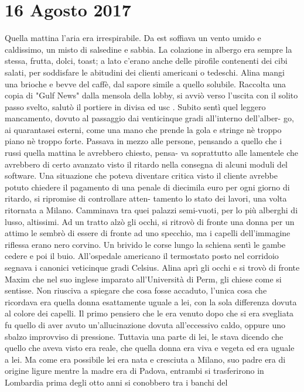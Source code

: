 \section{16 Agosto 2017}
Quella mattina l'aria era irrespirabile. Da est soffiava un vento umido e caldissimo, un
misto di salsedine e sabbia. La colazione in albergo era sempre la stessa, frutta, dolci, toast; a lato
c'erano anche delle pirofile contenenti dei cibi salati, per soddisfare le abitudini dei clienti americani o
tedeschi. Alina mangi una brioche e bevve del caffè, dal sapore simile a quello solubile.
Raccolta una copia di "Gulf News" dalla mensola della lobby, si avviò verso l'uscita con il solito passo
svelto, salutò il portiere in divisa ed usc .
Subito sentì quel leggero mancamento, dovuto al passaggio dai venticinque gradi all'interno dell'alber-
go, ai quarantasei esterni, come una mano che prende la gola e stringe nè troppo piano nè troppo forte.
Passava in mezzo alle persone, pensando a quello che i russi quella mattina le avrebbero chiesto, pensa-
va soprattutto alle lamentele che avrebbero di certo avanzato visto il ritardo nella consegna di alcuni
moduli del software. Una situazione che poteva diventare critica visto il cliente avrebbe potuto chiedere
il pagamento di una penale di diecimila euro per ogni giorno di ritardo, si ripromise di controllare atten-
tamento lo stato dei lavori, una volta ritornata a Milano. Camminava tra quei palazzi semi-vuoti, per lo
più alberghi di lusso, altissimi. Ad un tratto alzò gli occhi, si ritrovò di fronte una donna per un attimo
le sembrò di essere di fronte ad uno specchio, ma i capelli dell'immagine riflessa erano nero corvino.
Un brivido le corse lungo la schiena sentì le gambe cedere e poi il buio.
All'ospedale americano il termostato posto nel corridoio segnava i canonici veticinque gradi Celsius.
Alina aprì gli occhi e si trovò di fronte Maxim che nel suo inglese imparato all'Università di Perm, gli
chiese come si sentisse. Non riusciva a spiegare che cosa fosse accaduto, l'unica cosa che ricordava era
quella donna esattamente uguale a lei, con la sola differenza dovuta al colore dei capelli. Il primo
pensiero che le era venuto dopo che si era svegliata fu quello di aver avuto un'allucinazione dovuta
all'eccessivo caldo, oppure uno sbalzo improvviso di pressione. Tuttavia una parte di lei, le stava
dicendo che quello che aveva visto era reale, che quella donna era viva e vegeta ed era uguale a lei.
Ma come era possibile lei era nata e cresciuta a Milano, suo padre era di origine ligure mentre la madre
era di Padova, entrambi si trasferirono in Lombardia prima degli otto anni si conobbero tra i banchi del

